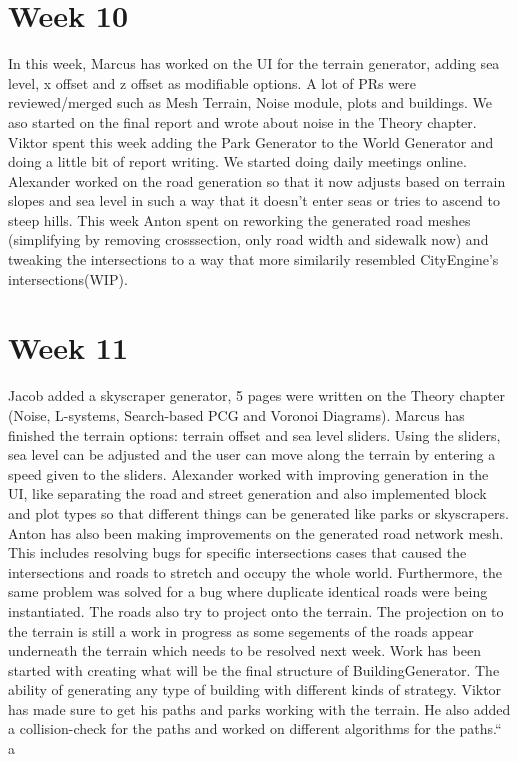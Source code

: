 \documentclass[11pt]{article}
\begin{document}
\section*{Week 10}
\label{sec:org798326f}
In this week, Marcus has worked on the UI for the terrain generator, adding sea
level, x offset and z offset as modifiable options. A lot of PRs were
reviewed/merged such as Mesh Terrain, Noise module, plots and buildings. We aso
started on the final report and wrote about noise in the Theory chapter. Viktor
spent this week adding the Park Generator to the World Generator and doing a
little bit of report writing. We started doing daily meetings online.
Alexander worked on the road generation so that it now adjusts based on terrain
slopes and sea level in such a way that it doesn't enter seas or tries to ascend
to steep hills. This week Anton spent on reworking the generated road meshes
(simplifying by removing crosssection, only road width and sidewalk now) and
tweaking the intersections to a way that more similarily resembled CityEngine's
intersections(WIP).

\section*{Week 11}
\label{sec:orgc729f88}
Jacob added a skyscraper generator, 5 pages were written on the Theory chapter
(Noise, L-systems, Search-based PCG and Voronoi Diagrams). Marcus has finished
the terrain options: terrain offset and sea level sliders. Using the sliders,
sea level can be adjusted and the user can move along the terrain by entering a
speed given to the sliders.
Alexander worked with improving generation in the UI, like separating the road
and street generation and also implemented block and plot types so that
different things can be generated like parks or skyscrapers.
Anton has also been making improvements on the generated road network mesh. This
includes resolving bugs for specific intersections cases that caused the
intersections and roads to stretch and occupy the whole world. Furthermore, the
same problem was solved for a bug where duplicate identical roads were being
instantiated. The roads also try to project onto the terrain. The projection on
to the terrain is still a work in progress as some segements of the roads appear
underneath the terrain which needs to be resolved next week.
Work has been started with creating what will be the final structure of
BuildingGenerator. The ability of generating any type of building with different
kinds of strategy. Viktor has made sure to get his paths and parks working with
the terrain. He also added a collision-check for the paths and worked on
different algorithms for the paths.``
a




\label{org71dc203}


\label{org92c661b}

\end{document}
